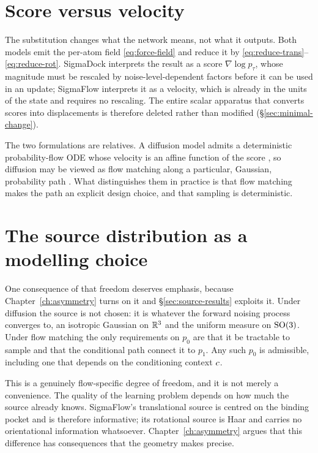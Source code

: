 \section{Score versus velocity}
\label{sec:score-vs-velocity}

The substitution changes what the network means, not what it outputs. Both
models emit the per-atom field \eqref{eq:force-field} and reduce it by
\eqref{eq:reduce-trans}--\eqref{eq:reduce-rot}. SigmaDock interprets the
result as a score $\nabla \log p_\tau$, whose magnitude must be rescaled by
noise-level-dependent factors before it can be used in an update; SigmaFlow
interprets it as a velocity, which is already in the units of the state and
requires no rescaling. The entire scalar apparatus that converts scores into
displacements is therefore deleted rather than modified
(\S\ref{sec:minimal-change}).

The two formulations are relatives. A diffusion model admits a deterministic
probability-flow ODE whose velocity is an affine function of the score
\citep{song2021sde}, so diffusion may be viewed as flow matching along a
particular, Gaussian, probability path \citep{lipman2023flow}. What
distinguishes them in practice is that flow matching makes the path an
explicit design choice, and that sampling is deterministic.

\section{The source distribution as a modelling choice}
\label{sec:source-theory}

One consequence of that freedom deserves emphasis, because
Chapter~\ref{ch:asymmetry} turns on it and \S\ref{sec:source-results} exploits
it. Under diffusion the source is not chosen: it is whatever the forward
noising process converges to, an isotropic Gaussian on $\mathbb{R}^3$ and the
uniform measure on $\mathrm{SO}(3)$. Under flow matching the only requirements on
$p_0$ are that it be tractable to sample and that the conditional path connect
it to $p_1$. Any such $p_0$ is admissible, including one that depends on the
conditioning context $c$.

This is a genuinely flow-specific degree of freedom, and it is not merely a
convenience. The quality of the learning problem depends on how much the
source already knows. SigmaFlow's translational source is centred on the
binding pocket and is therefore informative; its rotational source is Haar and
carries no orientational information whatsoever. Chapter~\ref{ch:asymmetry}
argues that this difference has consequences that the geometry makes precise.

